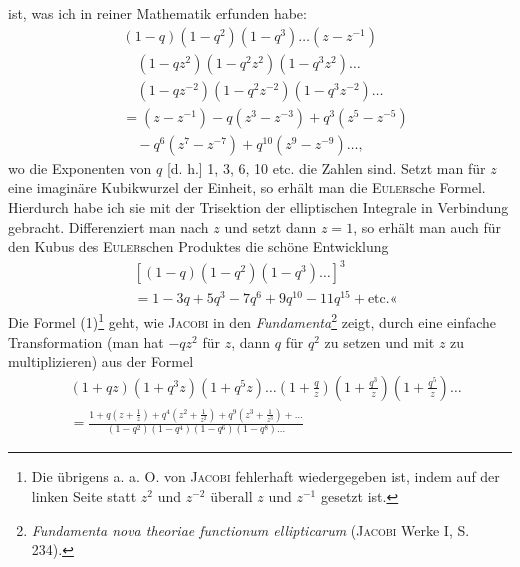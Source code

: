 ist, was ich in reiner Mathematik erfunden habe:
\begingroup\makeatletter\tagsleft@true\let\veqno\leqno\makeatother
\begin{equation*}\tag*{(1)}
\begin{aligned}
&(1-q)(1-q^2)(1-q^3)\ldots(z-z^{-1})\\
&\quad(1-qz^2)(1-q^2z^2)(1-q^3z^2)\ldots\\
&\quad(1-qz^{-2})(1-q^2z^{-2})(1-q^3z^{-2})\ldots\\
&=(z-z^{-1})-q(z^3-z^{-3})+q^3(z^5-z^{-5})\\
&\quad-q^6(z^7-z^{-7})+q^{10}(z^9-z^{-9})\ldots,
\end{aligned}
\end{equation*}\endgroup
wo die Exponenten von \(q\) [d. h.] 1, 3, 6, 10 etc. die  Zahlen
sind. Setzt man für \(z\) eine imaginäre Kubikwurzel der Einheit, so erhält
man die \textsc{Euler}sche Formel. Hierdurch habe ich sie mit der Trisektion der
elliptischen Integrale in Verbindung gebracht. Differenziert man nach \(z\) und
setzt dann \(z=1\), so erhält man auch für den Kubus des \textsc{Euler}schen Produktes
die schöne Entwicklung
\begingroup\makeatletter\tagsleft@true\let\veqno\leqno\makeatother
\begin{equation*}\tag*{(2)}
\begin{aligned}
&[(1-q)(1-q^2)(1-q^3)\ldots]^3\\
&=1-3q+5q^3-7q^6+9q^{10}-11q^{15}+\text{etc.}\text{«}
\end{aligned}
\end{equation*}\endgroup
\noindent Die Formel (1)\footnote{Die übrigens a. a. O. von \textsc{Jacobi} fehlerhaft wiedergegeben ist, indem auf der linken Seite statt \(z^2\) und \(z^{-2}\) überall \(z\) und \(z^{-1}\) gesetzt ist.} geht, wie \textsc{Jacobi} in den \textit{Fundamenta}\footnote{\textit{Fundamenta nova theoriae functionum ellipticarum} (\textsc{Jacobi} Werke I, S. 234).} zeigt, durch eine
einfache Transformation (man hat \(-qz^2\) für \(z\), dann \(q\) für \(q^2\) zu setzen und
mit \(z\) zu multiplizieren) aus der Formel
\begingroup\makeatletter\tagsleft@true\let\veqno\leqno\makeatother
\begin{equation*}\tag*{(3)}
\begin{aligned}
&(1+qz)(1+q^3z)(1+q^5z)\ldots\left(1+\frac qz\right)\left(1+\frac{q^3}z\right)\left(1+\frac{q^5}z\right)\ldots\\
&=\frac{1+q\left(z+\frac1z\right)+q^4\left(z^2+\frac1{z^2}\right)+q^9\left(z^3+\frac1{z^3}\right)+\ldots}{(1-q^2)(1-q^4)(1-q^6)(1-q^8)\ldots}
\end{aligned}
\end{equation*}\endgroup
